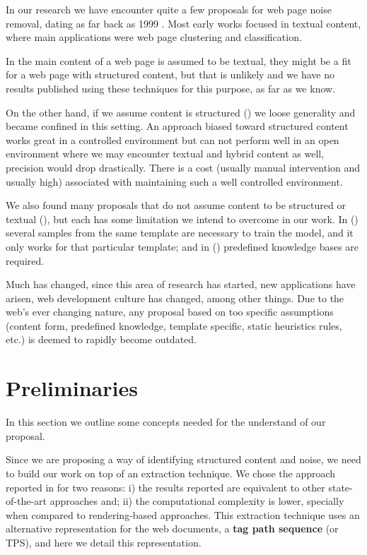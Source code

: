 In our research we have encounter quite a few proposals for web page noise
removal, dating as far back as 1999 \cite{kushmerick1999learning}. Most early
works focused in textual content, where main applications were web page
clustering and classification.

In \cite{Densiometric08,Boilerplate10, vieira2006fast, BlockImp07} the main
content of a web page is assumed to be textual, they might be a fit for a web
page with structured content, but that is unlikely and we have no results
published using these techniques for this purpose, as far as we know.

On the other hand, if we assume content is structured
(\cite{TPS2013,Velloso:2017:ERW:3132847.3132875}) we loose generality and became
confined in this setting. An approach biased toward structured content works
great in a controlled environment but can not perform well in an open
environment where we may encounter textual and hybrid content as well, precision
would drop drastically. There is a cost (usually manual intervention and usually
high) associated with maintaining such a well controlled environment.

We also found many proposals that do not assume content to be structured or
textual (\cite{Noisy03,Jointop07,SiteOriented11,Entropy09}), but each has some
limitation we intend to overcome in our work. In
(\cite{Jointop07,SiteOriented11,Noisy03}) several samples from the same template
are necessary to train the model, and it only works for that particular
template; and in (\cite{Entropy09}) predefined knowledge bases are required.

Much has changed, since this area of research has started, new applications have
arisen, web development culture has changed, among other things. Due to the
web's ever changing nature, any proposal based on too specific assumptions
(content form, predefined knowledge, template specific, static heuristics rules,
etc.) is deemed to rapidly become outdated.

\section{Preliminaries}\label{sec:prelim}
In this section we outline some concepts needed for the understand of our
proposal.

Since we are proposing a way of identifying structured content and noise, we
need to build our work on top of an extraction technique. We chose the approach
reported in \cite{Velloso:2017:ERW:3132847.3132875} for two reasons: i) the
results reported are equivalent to other state-of-the-art approaches and; ii)
the computational complexity is lower, specially when compared to
rendering-based approaches. This extraction technique uses an alternative
representation for the web documents, a \textbf{tag path sequence} (or TPS), and
here we detail this representation.

